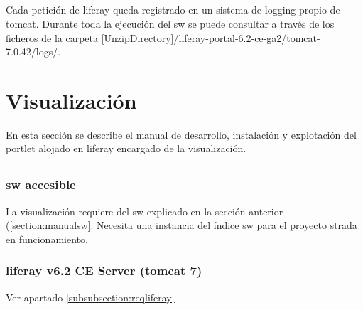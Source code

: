 \subsection{}
Cada petición de \gls{liferay} queda registrado en un sistema de \gls{logging} propio de \gls{tomcat}. Durante toda la ejecución del \gls{sw} se puede consultar a través de los ficheros de la carpeta [UnzipDirectory]/liferay-portal-6.2-ce-ga2/tomcat-7.0.42/logs/.

\section{Visualización}
En esta sección se describe el manual de desarrollo, instalación y explotación del \gls{portlet} alojado en \gls{liferay} encargado de la visualización.

\subsection{}

\subsubsection{\Gls{sw} accesible}
La visualización requiere del \gls{sw} explicado en la sección anterior (\ref{section:manualsw}. Necesita una instancia del índice \gls{sw} para el proyecto \gls{strada} en funcionamiento. 

\subsubsection{\Gls{liferay} v6.2 CE Server (\gls{tomcat} 7)}
Ver apartado \ref{subsubsection:reqliferay}

\subsection{}

